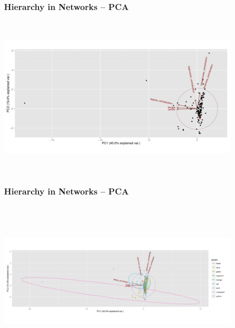 \documentclass[xcolor={table}]{beamer}
\newenvironment{changemargin}[2]{%
  \begin{list}{}{%
    \setlength{\topsep}{0pt}%
    \setlength{\leftmargin}{#1}%
    \setlength{\rightmargin}{#2}%
    \setlength{\listparindent}{\parindent}%
    \setlength{\itemindent}{\parindent}%
    \setlength{\parsep}{\parskip}%
  }%
  \item[]}{\end{list}}
\begin{document}
\begin{frame}\frametitle{Hierarchy in Networks -- PCA}
	\begin{changemargin}{-2cm}{ -2cm}
		\centering
		\includegraphics[width=12cm, height=8cm]{images/PCA_Plot.pdf}
	\end{changemargin}
\end{frame}

\begin{frame}\frametitle{Hierarchy in Networks -- PCA}
	\begin{changemargin}{-2cm}{ -2cm}
		\centering
		\includegraphics[width=12cm, height=8cm]{images/pca_colored.jpeg}
	\end{changemargin}
\end{frame}
\end{document}
